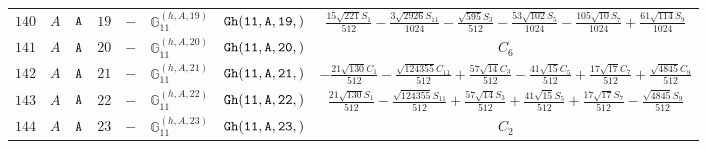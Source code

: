 \documentclass[fleqn,8pt]{jsarticle}
\begin{document}
\begin{table}[ht!]
\begin{center}
\begin{tabular}{cccccccc}
$ 140 $ & $ A $ & $ {\tt A} $ & $ 19 $ & $ - $ & $ \mathbb{G}_{11}^{(h,A,19)} $ & $ {\tt Gh(11,A,19,)} $ & $ \frac{15 \sqrt{221} S_{1}}{512} - \frac{3 \sqrt{2926} S_{11}}{1024} - \frac{\sqrt{595} S_{3}}{512} - \frac{53 \sqrt{102} S_{5}}{1024} - \frac{105 \sqrt{10} S_{7}}{1024} + \frac{61 \sqrt{114} S_{9}}{1024} $ \\
$ 141 $ & $ A $ & $ {\tt A} $ & $ 20 $ & $ - $ & $ \mathbb{G}_{11}^{(h,A,20)} $ & $ {\tt Gh(11,A,20,)} $ & $ C_{6} $ \\
$ 142 $ & $ A $ & $ {\tt A} $ & $ 21 $ & $ - $ & $ \mathbb{G}_{11}^{(h,A,21)} $ & $ {\tt Gh(11,A,21,)} $ & $ - \frac{21 \sqrt{130} C_{1}}{512} - \frac{\sqrt{124355} C_{11}}{512} + \frac{57 \sqrt{14} C_{3}}{512} - \frac{41 \sqrt{15} C_{5}}{512} + \frac{17 \sqrt{17} C_{7}}{512} + \frac{\sqrt{4845} C_{9}}{512} $ \\
$ 143 $ & $ A $ & $ {\tt A} $ & $ 22 $ & $ - $ & $ \mathbb{G}_{11}^{(h,A,22)} $ & $ {\tt Gh(11,A,22,)} $ & $ \frac{21 \sqrt{130} S_{1}}{512} - \frac{\sqrt{124355} S_{11}}{512} + \frac{57 \sqrt{14} S_{3}}{512} + \frac{41 \sqrt{15} S_{5}}{512} + \frac{17 \sqrt{17} S_{7}}{512} - \frac{\sqrt{4845} S_{9}}{512} $ \\
$ 144 $ & $ A $ & $ {\tt A} $ & $ 23 $ & $ - $ & $ \mathbb{G}_{11}^{(h,A,23)} $ & $ {\tt Gh(11,A,23,)} $ & $ C_{2} $ \\
 \hline \hline
\end{tabular}
\end{center}
\end{table}
\end{document}
